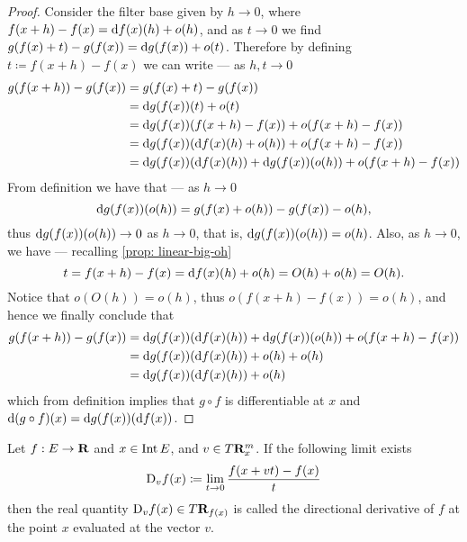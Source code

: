 \begin{proof}
  Consider the filter base given by \(h \to 0\), where \(f(x + h) - f(x) = \mathrm{d}
  f(x)(h) + o(h)\), and as \(t \to 0\) we find \(g(f(x) + t) - g(f(x)) = \mathrm{d}
  g(f(x)) + o(t)\). Therefore by defining \(t \coloneq f(x + h) - f(x)\) we can write ---
  as \(h, t \to 0\)
  \begin{align*}
    g(f(x + h)) - g(f(x)) &= g(f(x) + t) - g(f(x)) \\
                          &= \mathrm{d} g(f(x))(t) + o(t) \\
                          &= \mathrm{d} g(f(x))(f(x + h) - f(x)) + o(f(x + h) - f(x))
                          \\
                          &= \mathrm{d} g(f(x))(\mathrm{d} f(x)(h) + o(h)) + o(f(x + h) -
                          f(x))
                          \\
                          &= \mathrm{d} g(f(x))(\mathrm{d} f(x)(h)) + \mathrm{d} g(f(x))(o(h))
                          + o(f(x + h) - f(x))
  \end{align*}
  From definition we have that --- as \(h \to 0\)
  \[
    \mathrm{d} g(f(x))(o(h)) = g(f(x) + o(h)) - g(f(x)) - o(h),
  \]
  thus \(\mathrm{d} g(f(x))(o(h)) \to 0\) as \(h \to 0\), that is, \(\mathrm{d} g(f(x))
  (o(h)) = o(h)\). Also, as \(h \to 0\), we have --- recalling \cref{prop:
  linear-big-oh}
  \[
    t = f(x + h) - f(x) = \mathrm{d} f(x)(h) + o(h) = O(h) + o(h) = O(h).
  \]
  Notice that \(o(O(h)) = o(h)\), thus \(o(f(x + h) - f(x)) = o(h)\), and hence
  we finally conclude that
  \begin{align*}
    g(f(x + h)) - g(f(x))
    &= \mathrm{d} g(f(x))(\mathrm{d} f(x)(h)) + \mathrm{d} g(f(x))(o(h)) + o(f(x + h) - f(x))\\
    &= \mathrm{d} g(f(x))(\mathrm{d} f(x)(h)) + o(h) + o(h)\\
    &= \mathrm{d} g(f(x))(\mathrm{d} f(x)(h)) + o(h)
  \end{align*}
  which from definition implies that \(g \circ f\) is differentiable at \(x\)
  and \(\mathrm{d} (g \circ f)(x) = \mathrm{d} g(f(x))(\mathrm{d} f(x))\).
\end{proof}

\begin{definition}\label{def: dir-derivative}
  Let \(f: E \to \mathbf{R}\) and \(x \in  \operatorname{Int} E\), and \(v \in T\mathbf{R}^m_x\). If the
  following limit exists
  \begin{equation}
    \mathrm{D}_v f(x) \coloneq \lim_{t \to 0} \frac{f(x + v t) - f(x)}{t}
  \end{equation}
  then the real quantity \(\mathrm{D}_v f(x) \in T\mathbf{R}_{f(x)}\) is called the
  directional derivative of \(f\) at the point \(x\) evaluated at the vector
  \(v\).
\end{definition}

